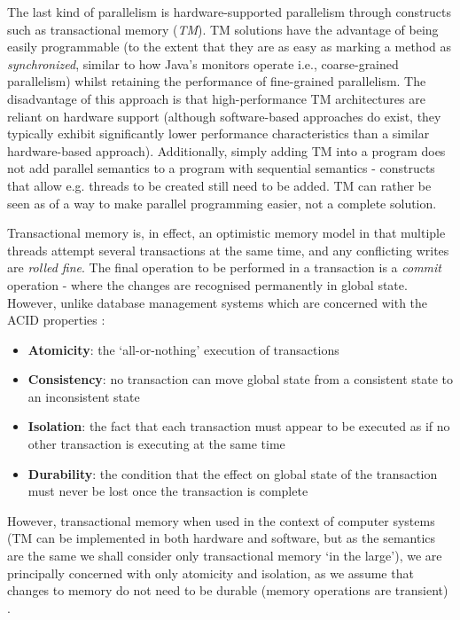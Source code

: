 The last kind of parallelism is hardware-supported parallelism through constructs such as transactional memory (\textit{TM}). TM solutions have the advantage of being easily programmable (to the extent that they are as easy as marking a method as \textit{synchronized}, similar to how Java's monitors operate i.e., coarse-grained parallelism) whilst retaining the performance of fine-grained parallelism. The disadvantage of this approach is that high-performance TM architectures are reliant on hardware support (although software-based approaches do exist, they typically exhibit significantly lower performance characteristics than a similar hardware-based approach). Additionally, simply adding TM into a program does not add parallel semantics to a program with sequential semantics - constructs that allow e.g. threads to be created still need to be added. TM can rather be seen as of a way to make parallel programming easier, not a complete solution.

Transactional memory is, in effect, an optimistic memory model in that multiple threads attempt several transactions at the same time, and any conflicting writes are \emph{rolled fine}. The final operation to be performed in a transaction is a \textit{commit} operation - where the changes are recognised permanently in global state. However, unlike database management systems which are concerned with the ACID properties \citep[p.~14]{DatabasesBook}:

\begin{itemize}
	\item \textbf{Atomicity}: the `all-or-nothing' execution of transactions
	\item \textbf{Consistency}: no transaction can move global state from a consistent state to an inconsistent state
	\item \textbf{Isolation}: the fact that each transaction must appear to be executed as if no other transaction is executing at the same time
	\item \textbf{Durability}: the condition that the effect on global state of the transaction must never be lost once the transaction is complete
\end{itemize}

However, transactional memory when used in the context of computer systems (TM can be implemented in both hardware and software, but as the semantics are the same we shall consider only transactional memory `in the large'), we are principally concerned with only atomicity and isolation, as we assume that changes to memory do not need to be durable (memory operations are transient) \citep{Marshall2005}.

